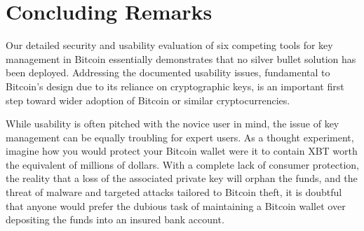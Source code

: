 
\section{Concluding Remarks}
Our detailed security and usability evaluation of six competing tools for key management in Bitcoin essentially demonstrates that no silver bullet solution has been deployed. Addressing the documented usability issues, fundamental to Bitcoin's design due to its reliance on cryptographic keys, is an important first step toward wider adoption of Bitcoin or similar cryptocurrencies. 

While usability is often pitched with the novice user in mind, the issue of key management can be equally troubling for expert users. As a thought experiment, imagine how you would protect your Bitcoin wallet were it to contain XBT worth the equivalent of millions of dollars. With a complete lack of consumer protection, the reality that a loss of the associated private key will orphan the funds, and the threat of malware and targeted attacks tailored to Bitcoin theft, it is doubtful that anyone would prefer the dubious task of maintaining a Bitcoin wallet over depositing the funds into an insured bank account. 

